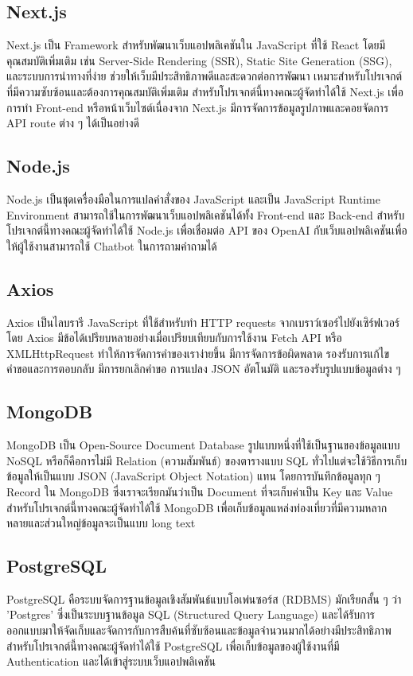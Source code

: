 \documentclass[12pt,oneside,openright,a4paper]{cpe-thai-project}
\begin{document}
\subsection{Next.js}
Next.js \cite{nextjs} เป็น Framework สำหรับพัฒนาเว็บแอปพลิเคชันใน JavaScript ที่ใช้ React โดยมีคุณสมบัติเพิ่มเติม เช่น Server-Side Rendering (SSR), Static Site Generation (SSG), และระบบการนำทางที่ง่าย ช่วยให้เว็บมีประสิทธิภาพดีและสะดวกต่อการพัฒนา เหมาะสำหรับโปรเจกต์ที่มีความซับซ้อนและต้องการคุณสมบัติเพิ่มเติม สำหรับโปรเจกต์นี้ทางคณะผู้จัดทำได้ใช้ Next.js เพื่อการทำ Front-end หรือหน้าเว็บไซต์เนื่องจาก Next.js มีการจัดการข้อมูลรูปภาพและคอยจัดการ API route ต่าง ๆ ได้เป็นอย่างดี

\subsection{Node.js}
Node.js \cite{nodejs} เป็นชุดเครื่องมือในการแปลคำสั่งของ JavaScript และเป็น JavaScript Runtime Environment สามารถใช้ในการพัฒนาเว็บแอปพลิเคชันได้ทั้ง Front-end และ Back-end สำหรับโปรเจกต์นี้ทางคณะผู้จัดทำได้ใช้ Node.js เพื่อเชื่อมต่อ API ของ OpenAI กับเว็บแอปพลิเคชันเพื่อให้ผู้ใช้งานสามารถใช้ Chatbot ในการถามคำถามได้

\subsection{Axios}
Axios \cite{axios} เป็นไลบรารี JavaScript ที่ใช้สำหรับทำ HTTP requests จากเบราว์เซอร์ไปยังเซิร์ฟเวอร์ โดย Axios มีข้อได้เปรียบหลายอย่างเมื่อเปรียบเทียบกับการใช้งาน Fetch API หรือ XMLHttpRequest ทำให้การจัดการคำของเราง่ายขึ้น มีการจัดการข้อผิดพลาด รองรับการแก้ไขคำขอและการตอบกลับ มีการยกเลิกคำขอ การแปลง JSON อัตโนมัติ และรองรับรูปแบบข้อมูลต่าง ๆ

\subsection{MongoDB}
MongoDB \cite{mongodb} เป็น Open-Source Document Database รูปแบบหนึ่งที่ใช้เป็นฐานของข้อมูลแบบ NoSQL หรือก็คือการไม่มี Relation (ความสัมพันธ์) ของตารางแบบ SQL ทั่วไปแต่จะใช้วิธีการเก็บข้อมูลให้เป็นแบบ JSON (JavaScript Object Notation) แทน โดยการบันทึกข้อมูลทุก ๆ Record ใน MongoDB ซึ่งเราจะเรียกมันว่าเป็น Document ที่จะเก็บค่าเป็น Key และ Value สำหรับโปรเจกต์นี้ทางคณะผู้จัดทำได้ใช้ MongoDB เพื่อเก็บข้อมูลแหล่งท่องเที่ยวที่มีความหลากหลายและส่วนใหญ่ข้อมูลจะเป็นแบบ long text

\subsection{PostgreSQL}
PostgreSQL \cite{postgresql} คือระบบจัดการฐานข้อมูลเชิงสัมพันธ์แบบโอเพ่นซอร์ส (RDBMS) มักเรียกสั้น ๆ ว่า 'Postgres' ซึ่งเป็นระบบฐานข้อมูล SQL (Structured Query Language) และได้รับการออกแบบมาให้จัดเก็บและจัดการกับการสืบค้นที่ซับซ้อนและข้อมูลจำนวนมากได้อย่างมีประสิทธิภาพ สำหรับโปรเจกต์นี้ทางคณะผู้จัดทำได้ใช้ PostgreSQL เพื่อเก็บข้อมูลของผู้ใช้งานที่มี Authentication และได้เข้าสู่ระบบเว็บแอปพลิเคชัน
\end{document}
